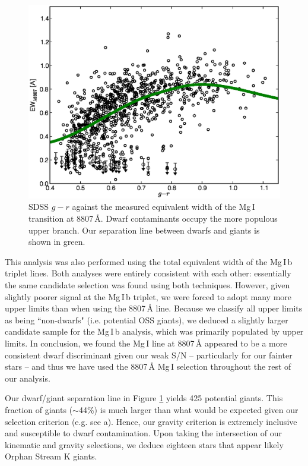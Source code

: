 \documentclass[10pt,apjl]{emulateapj}
\begin{document}
\begin{figure}[h]
	\includegraphics[width=\columnwidth]{./fig2.eps}
	\caption{SDSS $g - r$ against the measured equivalent width of the Mg\,\textsc{I} transition at 8807\,\AA{}. Dwarf contaminants occupy the more populous upper branch. Our separation line between dwarfs and giants is shown in green.}
	\label{fig:ew-mg}
\end{figure}

This analysis was also performed using the total equivalent width of the Mg\,\textsc{I}\,b triplet lines. Both analyses were entirely consistent with each other: essentially the same candidate selection was found using both techniques. However, given slightly poorer signal at the Mg\,\textsc{I}\,b triplet, we were forced to adopt many more upper limits than when using the 8807\,{\AA} line. Because we classify all upper limits as being ``non-dwarfs" (i.e. potential OSS giants), we deduced a slightly larger candidate sample for the Mg\,\textsc{I}\,b analysis, which was primarily populated by upper limits. In conclusion, we found the Mg\,\textsc{I} line at 8807\,{\AA} appeared to be a more consistent dwarf discriminant given our weak S/N \--- particularly for our fainter stars \--- and thus we have used the 8807\,{\AA} Mg\,\textsc{I} selection throughout the rest of our analysis.

Our dwarf/giant separation line in Figure \ref{fig:ew-mg} yields 425 potential giants. This fraction of giants ($\sim$44\%) is much larger than what would be expected given our selection criterion (e.g. see \citeauthor{Casey_et-al_2012} \citeyear{Casey_et-al_2012}a). Hence, our gravity criterion is extremely inclusive and susceptible to dwarf contamination. Upon taking the intersection of our kinematic and gravity selections, we deduce eighteen stars that appear likely Orphan Stream K giants.
\end{document}

